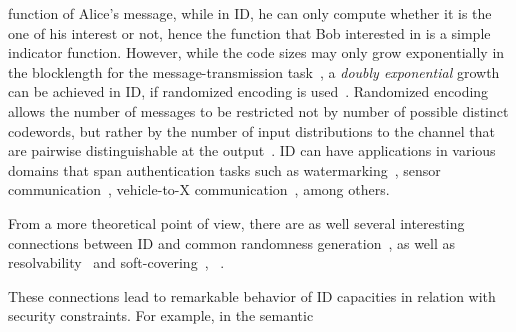 \documentclass[conference,final]{IEEEtran}
\begin{document}
function of Alice's message,
while in ID, he can only compute whether
it is the one of his interest or not, hence the function that Bob interested in is a simple indicator function.
However, while the code sizes may only grow exponentially  in the blocklength for the
message-transmission task~\cite{Shannon1948MathematicalTheoryCommunication,
  Yao1979SomeComplexityQuestions_conference,
  JaJa1985Identificationiseasier_conference,
  AhlswedeDueck1989Identificationviachannels},
a \emph{doubly exponential} growth can be achieved in ID,
if randomized encoding is used~\cite{AhlswedeDueck1989Identificationviachannels}.
Randomized encoding allows the number of messages to be restricted not by number of possible distinct codewords, but rather by the number of input distributions to the channel that
are pairwise distinguishable at the
output~\cite{AhlswedeDueck1989Identificationviachannels,HanVerdu1993Approximationtheoryoutput}.
ID can have applications in various domains that span authentication tasks such as
watermarking~\cite{SteinbergMerhav2001Identificationpresenceside,
  Steinberg2002Watermarkingidentificationprivate_conference},
sensor communication~\cite{GuenlueKliewerSchaeferSidorenko2021DoublyExponentialIdentification_conference},
vehicle-to-X communication~\cite{BocheDeppe2018SecureIdentificationWiretap,BocheArendt2021patentV2Xid,RosenbergerPeregDeppe2022IdentificationoverCompound_conference}, among others.

From a more theoretical point of view, there are as well several interesting connections between ID and common
randomness generation~\cite{AhlswedeCsiszar1998Commonrandomnessinformation},
as well as resolvability~\cite{HanVerdu1993Approximationtheoryoutput,
  Steinberg1998Newconversestheory,
  Hayashi2006Generalnonasymptoticasymptotic,
  Watanabe2022MinimaxConverseIdentification}
and soft-covering~\cite[p.~656]{Ahlswede2018CombinatorialMethodsModels},~
\cite{Wyner1975commoninformationtwo,Cuff15,BocheDeppe2019SecureIdentificationPassive}.

These connections lead to remarkable behavior of ID capacities in
relation
with security constraints.
For example, in the semantic
\end{document}
